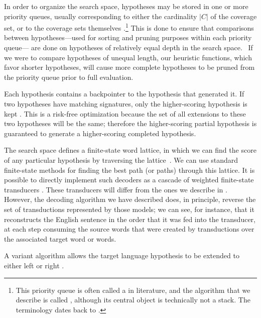 In order to organize the search space, hypotheses may be
stored in one or more priority queues, usually corresponding
to either the cardinality $|C|$ of the coverage set,
or to the coverage sets themselves \citep{Tillman:2003:cl}.\footnote{This priority
queue is often called a  in literature, and the 
algorithm that we describe is called ,
although its central object is technically not a stack.
The terminology dates back to \citet{Jelinek:1969:tr}.}
This is done to ensure that comparisons between
hypotheses---used for sorting and pruning purposes within
each priority queue---
are done on hypotheses of relatively equal depth in the search
space.~\citep{Wang:1997:acl}  If we were to compare hypotheses
of unequal length, our heuristic functions, which favor
shorter hypotheses, will cause more complete hypotheses
to be pruned from the priority queue prior to full
evaluation.  

Each hypothesis contains a backpointer to the hypothesis that generated
it.  If two hypotheses have matching signatures, only the 
higher-scoring hypothesis is kept \citep{Och:2001:ddmmt,Koehn:2004:amta}.  
This is a risk-free optimization because the set of all extensions
to these two hypotheses will be the same; therefore the higher-scoring
partial hypothesis is guaranteed to generate a higher-scoring completed 
hypothesis.

The search space defines a finite-state 
word lattice, in which we can 
find the score of any particular hypothesis by 
traversing the lattice~\citep{Ueffing:2002:emnlp,Koehn:2004:amta}.  We can
use standard finite-state methods for finding the 
best path (or paths) through this lattice.  It is possible
to directly implement such decoders as a cascade
of weighted finite-state transducers 
\citep{Knight:1998:amta,Kumar:2006:nle}.  These
transducers will differ from the ones we describe
in .  However, 
the decoding algorithm we have described does, in
principle, reverse the set of transductions 
represented by those models; we can see, for instance,
that it reconstructs the English sentence in the order
that it was fed into the transducer, at 
each step consuming the source words that were 
created by transductions over the associated 
target word or words.

A variant algorithm allows the target language
hypothesis to be extended to either left or right
\citep{Watanabe:2002:coling}.


